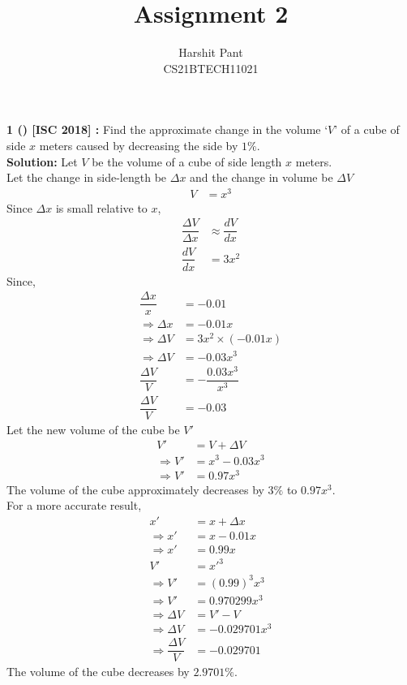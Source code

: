 \documentclass[journal,12pt,twocolumn]{IEEEtran}
\title{Assignment 2}
\author{Harshit Pant\\CS21BTECH11021}
\date{}
\begin{document}
\maketitle
\textbf{1 () [ISC 2018] :}
Find the approximate change in the volume `$V$' of a cube of side $x$ meters caused by decreasing the side by $1\%$.\\

\textbf{Solution:} Let $V$ be the volume of a cube of side length $x$ meters.\\
Let the change in side-length be $\Delta x$ and the change in volume be $\Delta V$
\begin{align}
V&=x^3
\end{align}
Since $\Delta x$ is small relative to $x$,
\addtolength{\jot}{.1in}
\begin{align}
\dfrac{\Delta V}{\Delta x}&\approx\dfrac{dV}{dx}\\
\dfrac{dV}{dx}&=3x^2
\end{align}
Since,
\begin{align}
\dfrac{\Delta x}{x}&=-0.01\\
\Rightarrow\Delta x&=-0.01x\\
\Rightarrow\Delta V&=3x^2\times(-0.01x)\\
\Rightarrow\Delta V&=-0.03x^3\\
\dfrac{\Delta V}{V}&=-\dfrac{0.03x^3}{x^3}\\
\dfrac{\Delta V}{V}&=-0.03
\end{align}
Let the new volume of the cube be $V'$
\begin{align}
V'&=V+\Delta V\\
\Rightarrow V'&=x^3-0.03x^3\\
\Rightarrow V'&=0.97x^3
\end{align}
The volume of the cube approximately decreases by $3\%$  to $0.97x^3$.\\
For a more accurate result,
\begin{align}
x'&=x+\Delta x\\
\Rightarrow x'&=x-0.01x\\
\Rightarrow x'&=0.99x\\
V'&={x'}^3\\
\Rightarrow V'&=(0.99)^3x^3\\
\Rightarrow V'&=0.970299x^3\\
\Rightarrow \Delta V&=V'-V\\
\Rightarrow \Delta V&=-0.029701x^3\\
\Rightarrow \dfrac{\Delta V}{V}&=-0.029701
\end{align}
The volume of the cube decreases by $2.9701\%$.
\end{document}
